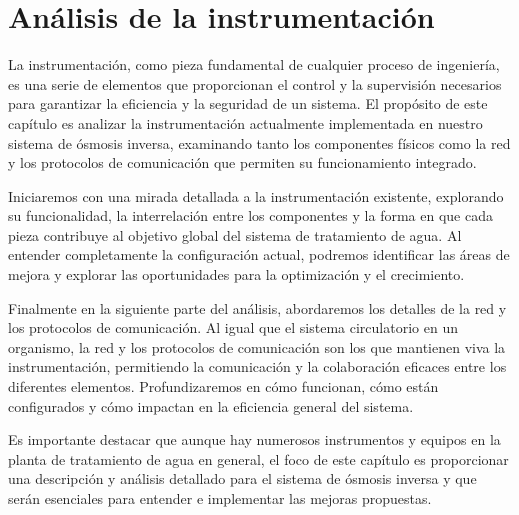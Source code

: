 \chapter{Análisis de la instrumentación}

La instrumentación, como pieza fundamental de cualquier proceso de ingeniería, es una serie de
elementos que proporcionan el control y la supervisión necesarios para garantizar la eficiencia y la
seguridad de un sistema. El propósito de este capítulo es analizar la instrumentación actualmente
implementada en nuestro sistema de ósmosis inversa, examinando tanto los componentes físicos
como la red y los protocolos de comunicación que permiten su funcionamiento integrado.

Iniciaremos con una mirada detallada a la instrumentación existente, explorando su funcionalidad,
la interrelación entre los componentes y la forma en que cada pieza contribuye al objetivo global del
sistema de tratamiento de agua. Al entender completamente la configuración actual, podremos identificar
las áreas de mejora y explorar las oportunidades para la optimización y el crecimiento.

Finalmente en la siguiente parte del análisis, abordaremos los detalles de la red y los protocolos de
comunicación. Al igual que el sistema circulatorio en un organismo, la red y los protocolos de
comunicación son los que mantienen viva la instrumentación, permitiendo la comunicación y la colaboración
eficaces entre los diferentes elementos. Profundizaremos en cómo funcionan, cómo están configurados y
cómo impactan en la eficiencia general del sistema.

Es importante destacar que aunque hay numerosos instrumentos y equipos en la planta de tratamiento de agua en general,
el foco de este capítulo es proporcionar una descripción y análisis detallado  para el sistema
de ósmosis inversa y que serán esenciales para entender e implementar las mejoras propuestas.







